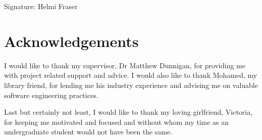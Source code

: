 \documentclass[a4paper,12pt]{report}
\newcommand{\linespacing}{1.5}
\renewcommand{\baselinestretch}{\linespacing}
\begin{document}
\vskip5mm
Signature:
\vskip20mm
Helmi Fraser

\chapter*{Acknowledgements}
\renewcommand{\baselinestretch}{\linespacing}
\small\normalsize
\begin{flushleft}
I would like to thank my supervisor, Dr Matthew Dunnigan, for providing me with project related support and advice. I would also like to thank Mohamed, my library friend, for lending me his industry experience and advising me on valuable software engineering practices. 

Last but certainly not least, I would like to thank my loving girlfriend, Victoria, for keeping me motivated and focused and without whom my time as an undergraduate student would not have been the same.
\end{flushleft}





{}
\tableofcontents



\pagestyle{fancy}
\cfoot{\thepage}
\clearpage
{}
\flushleft


%

\clearpage
{}
















\clearpage
{}
{}



\appendix
\end{document}
